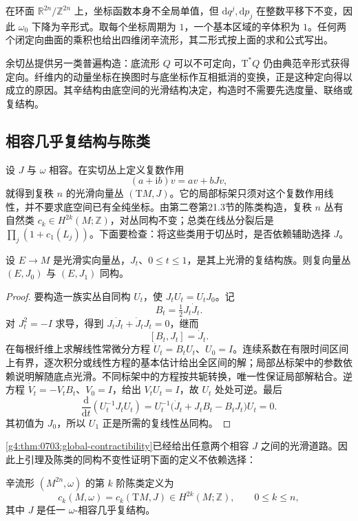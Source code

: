 在环面 \(\mathbb R^{2n}/\mathbb Z^{2n}\) 上，坐标函数本身不全局单值，但 \(\mathrm{d}q^j,\mathrm{d}p_j\) 在整数平移下不变，因此 \(\omega_0\) 下降为辛形式。取每个坐标周期为 \(1\)，一个基本区域的辛体积为 \(1\)。任何两个闭定向曲面的乘积也给出四维闭辛流形，其二形式按上面的求和公式写出。

\ProseParagraphBreak

余切丛提供另一类普遍构造：底流形 \(Q\) 可以不可定向，\(\mathrm{T}^*Q\) 仍由典范辛形式获得定向。纤维内的动量坐标在换图时与底坐标作互相抵消的变换，正是这种定向得以成立的原因。其辛结构由底空间的光滑结构决定，构造时不需要先选度量、联络或复结构。

\subsection{相容几乎复结构与陈类}
\label{g4:subsec:0704:03}

设 \(J\) 与 \(\omega\) 相容。在实切丛上定义复数作用
\[
	(a+\mathrm{i}b)v=av+bJv,
\]
就得到复秩 \(n\) 的光滑向量丛 \((\mathrm{T}M,J)\)。它的局部标架只须对这个复数作用线性，并不要求底空间已有全纯坐标。由第二卷第21.3节的陈类构造，复秩 \(n\) 丛有自然类 \(c_k\in H^{2k}(M;\mathbb Z)\)，对丛同构不变；总类在线丛分裂后是 \(\prod_j(1+c_1(L_j))\)。下面要检查：将这些类用于切丛时，是否依赖辅助选择 \(J\)。

\begin{lemma}\label{g4:lem:0704:complex-path-isomorphism}
	设 \(E\to M\) 是光滑实向量丛，\(J_t\)、\(0\le t\le1\)，是其上光滑的复结构族。则复向量丛 \((E,J_0)\) 与 \((E,J_1)\) 同构。
\end{lemma}
\begin{proof}
	要构造一族实丛自同构 \(U_t\)，使 \(J_tU_t=U_tJ_0\)。记
	\[
		B_t=\tfrac12J_t\dot J_t.
	\]
	对 \(J_t^2=-I\) 求导，得到 \(J_t\dot J_t+\dot J_tJ_t=0\)，继而
	\[
		[B_t,J_t]=\dot J_t.
	\]
	在每根纤维上求解线性常微分方程 \(\dot U_t=B_tU_t\)、\(U_0=I\)。连续系数在有限时间区间上有界，逐次积分或线性方程的基本估计给出全区间的解；局部丛标架中的参数依赖说明解随底点光滑。不同标架中的方程按共轭转换，唯一性保证局部解粘合。逆方程 \(\dot V_t=-V_tB_t\)、\(V_0=I\)，给出 \(V_tU_t=I\)，故 \(U_t\) 处处可逆。最后
	\[
		\frac{\mathrm{d}}{\mathrm{d}t}(U_t^{-1}J_tU_t)
		=U_t^{-1}\bigl(\dot J_t+J_tB_t-B_tJ_t\bigr)U_t=0.
	\]
	其初值为 \(J_0\)，所以 \(U_1\) 正是所需的复线性丛同构。
\end{proof}

\cref{g4:thm:0703:global-contractibility}已经给出任意两个相容 \(J\) 之间的光滑道路。因此上引理及陈类的同构不变性证明下面的定义不依赖选择：
\begin{definition}\label{g4:def:0704:symplectic-chern}
	辛流形 \((M^{2n},\omega)\) 的第 \(k\) 阶陈类定义为
	\[
		c_k(M,\omega)=c_k(\mathrm{T}M,J)\in H^{2k}(M;\mathbb Z),
		\qquad 0\le k\le n,
	\]
	其中 \(J\) 是任一 \(\omega\)-相容几乎复结构。
\end{definition}

